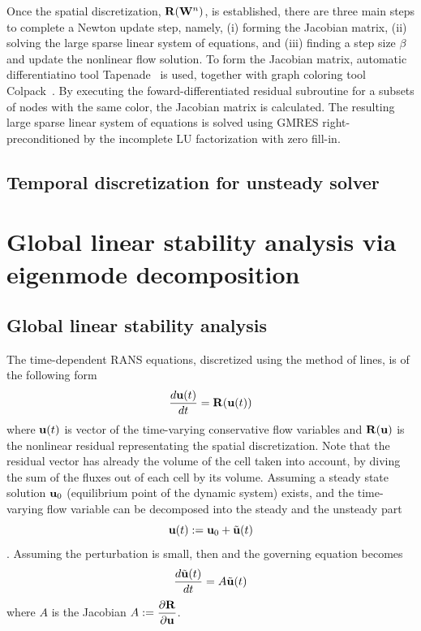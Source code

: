 \documentclass[journal,final]{new-aiaa}
\begin{document}
Once the spatial discretization,  $\mathbf{R}(\mathbf{W}^n)$, is established,
there are three main steps to complete a Newton update step,
namely, (i) forming the Jacobian matrix, (ii)
solving the large sparse linear system of equations,
and (iii) finding a step size $\beta$ and update the nonlinear
flow solution.
To form the Jacobian matrix, automatic differentiatino tool Tapenade~\cite{Tapenade}
is used, together with graph coloring tool Colpack~\cite{gebremedhin2013colpack}.
By executing the
foward-differentiated residual subroutine for a subsets of nodes
with the same color, the Jacobian matrix is calculated. The resulting
large sparse linear system of equations is solved using GMRES
right-preconditioned by the incomplete LU factorization with zero
fill-in. 

\subsection{Temporal discretization for unsteady solver}




\section{Global linear stability analysis via eigenmode decomposition}
\label{label:sec2}
\subsection{Global linear stability analysis}
The time-dependent RANS equations, discretized
using the method of lines,
is of the following form
\begin{equation}\label{timedomain}
 \dfrac{d \mathbf{u}(t)}{dt}=\mathbf{R}(\mathbf{u}(t))
\end{equation}
where $\mathbf{u}(t)$ is vector of the time-varying conservative flow variables
and $\mathbf{R}(\mathbf{u})$ is the nonlinear residual representating the spatial discretization.
Note that the residual vector has already the volume of the cell taken into
account, by diving the sum of the fluxes out of each cell by its volume.
Assuming a steady state solution $\mathbf{u}_0$ (equilibrium point of the dynamic system)
exists, and the time-varying flow variable can be decomposed into the
steady and the unsteady part 
\begin{equation*}
\mathbf{u}(t):=\mathbf{u}_0 + \tilde {\mathbf{u}}(t)
\end{equation*}.
Assuming the perturbation is small, then
and the governing equation becomes
\begin{equation*}
\dfrac{d \tilde {\mathbf{u}}(t)}{dt}=A \tilde {\mathbf{u}}(t)
\end{equation*}
where $A$ is the Jacobian $A:=\dfrac{\partial\mathbf{R}}{\partial\mathbf{u}}$.
\end{document}
